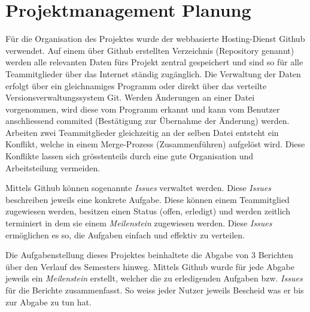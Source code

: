 \section{Projektmanagement Planung}
Für die Organisation des Projektes wurde der webbasierte Hosting-Dienst Github verwendet. Auf einem über Github erstellten Verzeichnis (Repository genannt) werden alle relevanten Daten fürs Projekt zentral gespeichert und sind so für alle Teammitglieder über das Internet ständig zugänglich. Die Verwaltung der Daten erfolgt über ein gleichnamiges Programm oder direkt über das verteilte Versionsverwaltungssystem Git. Werden Änderungen an einer Datei vorgenommen, wird diese vom Programm erkannt und kann vom Benutzer anschliessend commited (Bestätigung zur Übernahme der Änderung) werden. Arbeiten zwei Teammitglieder gleichzeitig an der selben Datei entsteht ein Konflikt, welche in einem Merge-Prozess (Zusammenführen) aufgelöst wird. Diese Konflikte lassen sich grösstenteils durch eine gute Organisation und Arbeitsteilung vermeiden.

Mittels Github können sogenannte \emph{Issues} verwaltet werden. Diese \emph{Issues} beschreiben jeweils eine konkrete Aufgabe. Diese können einem Teammitglied zugewiesen werden, besitzen einen Status (offen, erledigt) und werden zeitlich terminiert in dem sie einem \emph{Meilenstein} zugewiesen werden. Diese \emph{Issues} ermöglichen es so, die Aufgaben einfach und effektiv zu verteilen.

Die Aufgabenstellung dieses Projektes beinhaltete die Abgabe von 3 Berichten über den Verlauf des Semesters hinweg. Mittels Github wurde für jede Abgabe jeweils ein \emph{Meilenstein} erstellt, welcher die zu erledigenden Aufgaben bzw. \emph{Issues} für die Berichte zusammenfasst. So weiss jeder Nutzer jeweils Bescheid was er bis zur Abgabe zu tun hat.







